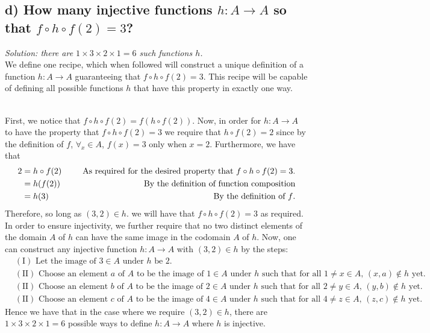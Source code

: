 \documentclass[11pt, letterpaper]{article}
\begin{document}
\subsection*{d) How many injective functions $h:A\rightarrow A$ so that $f\circ h\circ f(2)=3$?}
{\large\it Solution: there are $1\times 3\times 2\times 1=6$ such functions $h$.}\\[0.25cm]
We define one recipe, which when followed will construct a unique definition of a function $h:A\rightarrow A$ guaranteeing that $f\circ h\circ f(2)=3$.
This recipe will be capable of defining all possible functions $h$ that have this property in exactly one way.
\begin{recipe}~\\
    First, we notice that $f\circ h\circ f(2)=f(h\circ f(2))$. Now, in order for $h:A\rightarrow A$ to have the property that $f\circ h\circ f(2)=3$ we require that $h\circ f(2)=2$ since by the definition of $f$, $\forall_x\in A$, $f(x)=3$ only when $x=2$. Furthermore, we have that
    \begin{align*}
        2&=h\circ f(2) &\text{\indent As required for the desired property that $f\circ h \circ f(2)=3$.}\\
        &= h(f(2)) &\text{\indent By the definition of function composition}\\
        &=h(3) &\text{\indent By the definition of $f$.}
    \end{align*}
    Therefore, so long as $(3,2)\in h$. we will have that $f\circ h\circ f(2)=3$ as required. In order to ensure injectivity, we further require that no two distinct elements of the domain $A$ of $h$ can have the same image in the codomain $A$ of $h$. 
    Now, one can construct any injective function $h:A\rightarrow A$ with $(3,2)\in h$ by the steps:
    \begin{align*}
       &(\text{I}) \text{ Let the image of $3\in A$ under $h$ be 2.}\\ 
       &(\text{II}) \text{ Choose an element $a$ of $A$ to be the image of $1\in A$ under $h$ such that for all $1\neq x\in A$, $(x,a)\notin h$ yet.}\\ 
       &(\text{II}) \text{ Choose an element $b$ of $A$ to be the image of $2\in A$ under $h$ such that for all $2\neq y\in A$, $(y,b)\notin h$ yet.}\\ 
       &(\text{II}) \text{ Choose an element $c$ of $A$ to be the image of $4\in A$ under $h$ such that for all $4\neq z\in A$, $(z,c)\notin h$ yet.} 
    \end{align*}
    Hence we have that in the case where we require $(3,2)\in h$, there are $1\times 3\times 2\times 1=6$ possible ways to define $h:A\rightarrow A$ where $h$ is injective.
\end{recipe}
\end{document}
